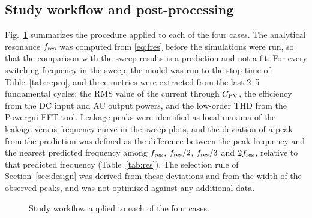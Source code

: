\subsection{Study workflow and post-processing}
Fig.~\ref{fig:workflow} summarizes the procedure applied to each of the four cases. The analytical resonance $f_{\mathrm{res}}$ was computed from \eqref{eq:fres} before the simulations were run, so that the comparison with the sweep results is a prediction and not a fit. For every switching frequency in the sweep, the model was run to the stop time of Table~\ref{tab:repro}, and three metrics were extracted from the last 2--5 fundamental cycles: the RMS value of the current through $C_{\mathrm{PV}}$, the efficiency from the DC input and AC output powers, and the low-order THD from the Powergui FFT tool. Leakage peaks were identified as local maxima of the leakage-versus-frequency curve in the sweep plots, and the deviation of a peak from the prediction was defined as the difference between the peak frequency and the nearest predicted frequency among $f_{\mathrm{res}}$, $f_{\mathrm{res}}/2$, $f_{\mathrm{res}}/3$ and $2f_{\mathrm{res}}$, relative to that predicted frequency (Table~\ref{tab:res}). The selection rule of Section~\ref{sec:design} was derived from these deviations and from the width of the observed peaks, and was not optimized against any additional data.

\begin{figure}[!t]
\centering
{}
\caption{Study workflow applied to each of the four cases.}
\label{fig:workflow}
\end{figure}
